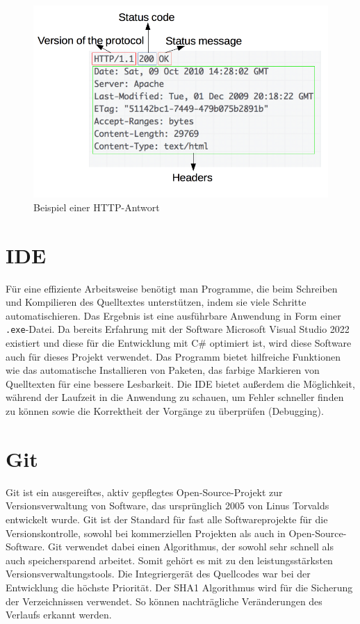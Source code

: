 \begin{figure}[ht]
	\centering
	\includegraphics[width=0.7\linewidth]{http_response.png}
	\caption{Beispiel einer HTTP-Antwort}
	\label{http-response}
\end{figure}

\section{IDE}
Für eine effiziente Arbeitsweise benötigt man Programme, die beim Schreiben und Kompilieren des Quelltextes unterstützen, indem sie viele Schritte automatischieren.
Das Ergebnis ist eine ausführbare Anwendung in Form einer \texttt{.exe}-Datei. 
Da bereits Erfahrung mit der Software Microsoft Visual Studio 2022 existiert und diese für die Entwicklung mit C\# optimiert ist, wird diese Software auch für dieses Projekt verwendet. 
Das Programm bietet hilfreiche Funktionen wie das automatische Installieren von Paketen, das farbige Markieren von Quelltexten für eine bessere Lesbarkeit. 
Die IDE bietet außerdem die Möglichkeit, während der Laufzeit in die Anwendung zu schauen, um Fehler schneller finden zu können sowie die Korrektheit der Vorgänge zu überprüfen (Debugging).

\section{Git}
Git ist ein ausgereiftes, aktiv gepflegtes Open-Source-Projekt zur Versionsverwaltung von Software, das ursprünglich 2005 von Linus Torvalds entwickelt wurde.
Git ist der Standard für fast alle Softwareprojekte für die Versionskontrolle, sowohl bei kommerziellen Projekten als auch in Open-Source-Software.
Git verwendet dabei einen Algorithmus, der sowohl sehr schnell als auch speichersparend arbeitet.
Somit gehört es mit zu den leistungsstärksten Versionsverwaltungstools.
Die Integriergerät des Quellcodes war bei der Entwicklung die höchste Priorität. 
Der SHA1 Algorithmus wird für die Sicherung der Verzeichnissen verwendet. 
So können nachträgliche Veränderungen des Verlaufs erkannt werden.

